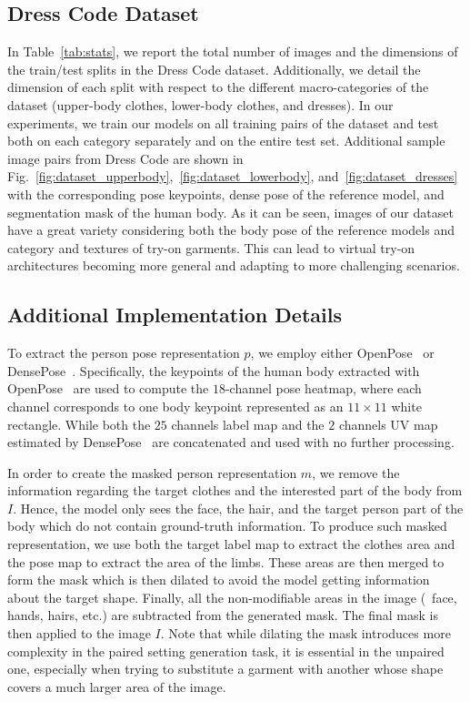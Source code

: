 \subsection*{Dress Code Dataset}
In Table~\ref{tab:stats}, we report the total number of images and the dimensions of the train/test splits in the Dress Code dataset. Additionally, we detail the dimension of each split with respect to the different macro-categories of the dataset (upper-body clothes, lower-body clothes, and dresses). In our experiments, we train our models on all training pairs of the dataset and test both on each category separately and on the entire test set. Additional sample image pairs from Dress Code are shown in Fig.~\ref{fig:dataset_upperbody},~\ref{fig:dataset_lowerbody}, and~\ref{fig:dataset_dresses} with the corresponding pose keypoints, dense pose of the reference model, and segmentation mask of the human body. As it can be seen, images of our dataset have a great variety considering both the body pose of the reference models and category and textures of try-on garments. This can lead to virtual try-on architectures becoming more general and adapting to more challenging scenarios.

\subsection*{Additional Implementation Details}

To extract the person pose representation $p$, we employ either OpenPose~\cite{cao2017realtime} or DensePose~\cite{guler2018densepose}. Specifically, the keypoints of the human body extracted with OpenPose~\cite{cao2017realtime} are used to compute the $18$-channel pose heatmap, where each channel corresponds to one body keypoint represented as an $11 \times 11$ white rectangle. While both the $25$ channels label map and the $2$ channels UV map estimated by DensePose~\cite{guler2018densepose} are concatenated and used with no further processing.

In order to create the masked person representation $m$, we remove the information regarding the target clothes and the interested part of the body from $I$. Hence, the model only sees the face, the hair, and the target person part of the body which do not contain ground-truth information. 
To produce such masked representation, we use both the target label map to extract the clothes area and the pose map to extract the area of the limbs. These areas are then merged to form the mask which is then dilated to avoid the model getting information about the target shape. Finally, all the non-modifiable areas in the image (\eg~face, hands, hairs, etc.) are subtracted from the generated mask. The final mask is then applied to the image $I$. Note that while dilating the mask introduces more complexity in the paired setting generation task, it is essential in the unpaired one, especially when trying to substitute a garment with another whose shape covers a much larger area of the image.  

